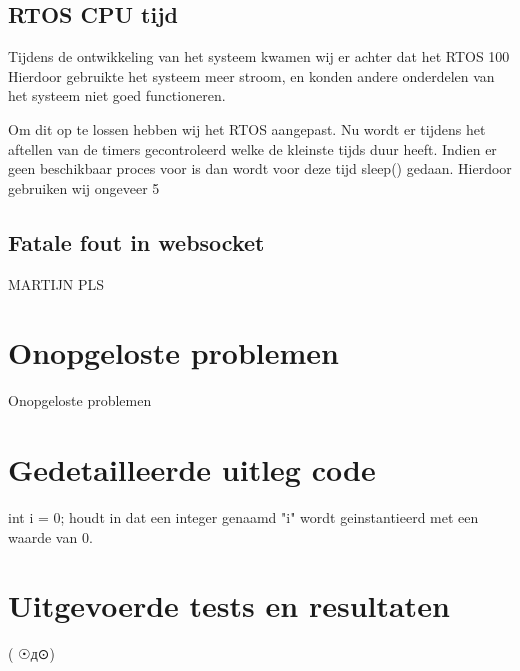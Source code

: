 \subsection{RTOS CPU tijd}
Tijdens de ontwikkeling van het systeem kwamen wij er achter dat het RTOS 100%
Hierdoor gebruikte het systeem meer stroom, en konden andere onderdelen van het systeem niet goed functioneren.

Om dit op te lossen hebben wij het RTOS aangepast.
Nu wordt er tijdens het aftellen van de timers gecontroleerd welke de kleinste tijds duur heeft. Indien er geen beschikbaar proces voor is dan wordt voor deze tijd sleep() gedaan.
Hierdoor gebruiken wij ongeveer 5%

\subsection{Fatale fout in websocket}
MARTIJN PLS

\section{Onopgeloste problemen}
Onopgeloste problemen

\section{Gedetailleerde uitleg code}
int i = 0; houdt in dat een integer genaamd "i" wordt geinstantieerd met een waarde van 0.

\section{Uitgevoerde tests en resultaten}
( ☉д⊙)